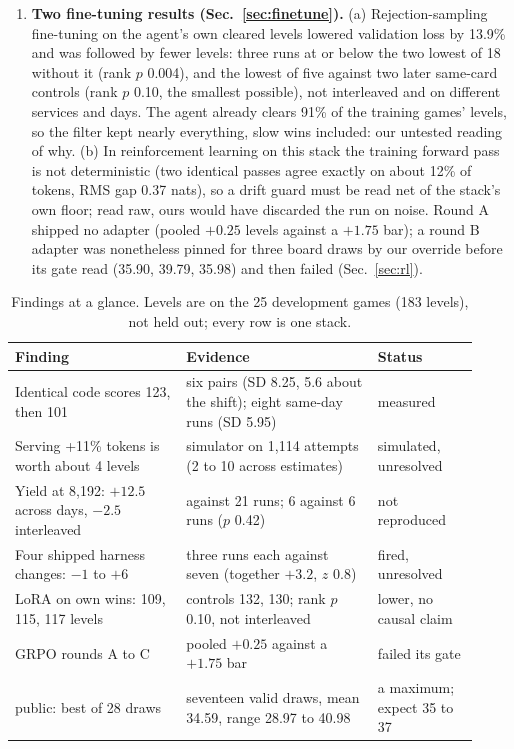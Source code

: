 \begin{enumerate}
\item \textbf{Two fine-tuning results (Sec.~\ref{sec:finetune}).}
(a) Rejection-sampling fine-tuning on the agent's own cleared levels lowered validation loss by 13.9\% and was followed by fewer levels: three runs at or below the two lowest of 18 without it (rank $p$ 0.004), and the lowest of five against two later same-card controls (rank $p$ 0.10, the smallest possible), not interleaved and on different services and days. %
The agent already clears 91\% of the training games' levels, so the filter kept nearly everything, slow wins included: our untested reading of why. %
(b) In reinforcement learning on this stack the training forward pass is not deterministic (two identical passes agree exactly on about 12\% of tokens, RMS gap 0.37 nats), so a drift guard must be read net of the stack's own floor; read raw, ours would have discarded the run on noise. %
Round A shipped no adapter (pooled $+0.25$ levels against a $+1.75$ bar); a round B adapter was nonetheless pinned for three board draws by our override before its gate read (35.90, 39.79, 35.98) and then failed (Sec.~\ref{sec:rl}). %
\end{enumerate}

\begin{table}[t]
\caption{Findings at a glance. Levels are on the 25 development games (183 levels), not held out; every row is one stack.}\label{tab:glance}
\centering\footnotesize
\setlength{\tabcolsep}{3pt}\renewcommand{\arraystretch}{1.3}
\begin{tabular}{@{}>{\raggedright\arraybackslash}p{0.34\linewidth}>{\raggedright\arraybackslash}p{0.38\linewidth}>{\raggedright\arraybackslash}p{0.2\linewidth}@{}}
\toprule
Finding & Evidence & Status \\
\midrule
Identical code scores 123, then 101 & six pairs (SD 8.25, 5.6 about the shift); eight same-day runs (SD 5.95) & measured \\ %
Serving +11\% tokens is worth about 4 levels & simulator on 1,114 attempts (2 to 10 across estimates) & simulated, unresolved \\ %
Yield at 8,192: $+12.5$ across days, $-2.5$ interleaved & 9 against 21 runs; 6 against 6 runs ($p$ 0.42) & not reproduced \\ %
Four shipped harness changes: $-1$ to $+6$ & three runs each against seven (together $+3.2$, $z$ 0.8) & fired, unresolved \\ %
LoRA on own wins: 109, 115, 117 levels & controls 132, 130; rank $p$ 0.10, not interleaved & lower, no causal claim \\ %
GRPO rounds A to C & pooled $+0.25$ against a $+1.75$ bar & failed its gate \\ %
40.98 public: best of 28 draws & seventeen valid draws, mean 34.59, range 28.97 to 40.98 & a maximum; expect 35 to 37 \\ %
\bottomrule
\end{tabular}
\end{table}

